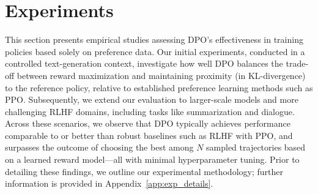 \section{Experiments}
This section presents empirical studies assessing DPO’s effectiveness in training policies based solely on preference data. Our initial experiments, conducted in a controlled text-generation context, investigate how well DPO balances the trade-off between reward maximization and maintaining proximity (in KL-divergence) to the reference policy, relative to established preference learning methods such as PPO. Subsequently, we extend our evaluation to larger-scale models and more challenging RLHF domains, including tasks like summarization and dialogue. Across these scenarios, we observe that DPO typically achieves performance comparable to or better than robust baselines such as RLHF with PPO, and surpasses the outcome of choosing the best among $N$ sampled trajectories based on a learned reward model—all with minimal hyperparameter tuning. Prior to detailing these findings, we outline our experimental methodology; further information is provided in Appendix~\ref{app:exp_details}.


